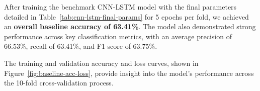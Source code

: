 After training the benchmark CNN-LSTM model with the final parameters detailed in Table~\ref{tab:cnn-lstm-final-params} for 5 epochs per fold, we achieved an \textbf{overall baseline accuracy of 63.41\%}. The model also demonstrated strong performance across key classification metrics, with an average precision of 66.53\%, recall of 63.41\%, and F1 score of 63.75\%.

The training and validation accuracy and loss curves, shown in Figure~\ref{fig:baseline-acc-loss}, provide insight into the model's performance across the 10-fold cross-validation process. %





